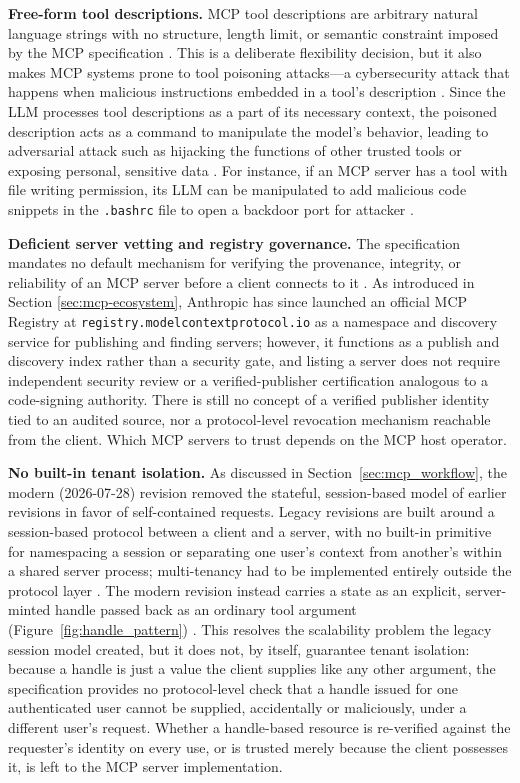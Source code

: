 \documentclass[english, 12pt, a4paper, elec, utf8, a-2b, online]{aaltothesis}
\begin{document}
\textbf{Free-form tool descriptions.}
MCP tool descriptions are arbitrary natural language strings with no structure, length limit, or semantic
constraint imposed by the MCP specification \cite{mcpspec2026}.
This is a deliberate flexibility decision, but it also makes MCP systems prone to tool poisoning attacks—a cybersecurity attack that happens when malicious instructions embedded in a tool's description \cite{hasan2026mcp}. 
Since the LLM processes tool descriptions as a part of its necessary context, the poisoned description acts as a command to manipulate the model's behavior, leading to adversarial attack such as hijacking the functions of other trusted tools or exposing personal, sensitive data \cite{wang2026mcptox}.
For instance, if an MCP server has a tool with file writing permission, its LLM can be manipulated to add malicious code snippets in the \texttt{.bashrc} file to open a backdoor port for attacker \cite{radosevich2025mcp}.

\textbf{Deficient server vetting and registry governance.}
The specification mandates no default mechanism for verifying the provenance, integrity, or reliability of an MCP server before a client connects to it \cite{mcpspec2026}. 
As introduced in Section \ref{sec:mcp-ecosystem}, Anthropic has since launched an official MCP Registry at \texttt{registry.modelcontextprotocol.io} as a namespace and discovery service for publishing and
finding servers; however, it functions as a publish and discovery index rather than a security gate, and listing a server does not require independent security review or a verified-publisher certification analogous to a code-signing authority. There is still no concept of a verified publisher identity tied to an audited source, nor a protocol-level revocation mechanism reachable from the client. Which MCP servers to trust depends on the MCP host operator.

\textbf{No built-in tenant isolation.}
As discussed in Section~\ref{sec:mcp_workflow}, the modern (2026-07-28) revision removed the stateful, session-based model of earlier revisions in favor of self-contained requests. Legacy revisions are built around a session-based protocol between a client and a server, with no built-in primitive for namespacing a session or separating one user's context from another's within a shared
server process; multi-tenancy had to be implemented entirely outside the protocol layer \cite{mcpversioning2026}. 
The modern revision instead carries a state as an explicit, server-minted handle passed back as an ordinary tool argument (Figure~\ref{fig:handle_pattern}) \cite{mcp_revision_blog}. This resolves the scalability problem the legacy session model created, but it does not, by itself, guarantee tenant isolation: because a handle is just a value the client supplies like any other argument, the specification provides no protocol-level check that a handle issued for one authenticated user cannot be supplied, accidentally or maliciously, under a different user's request. 
Whether a handle-based resource is re-verified against the requester's identity on every use, or is trusted merely because the client possesses it, is left to the MCP server implementation.
\end{document}
